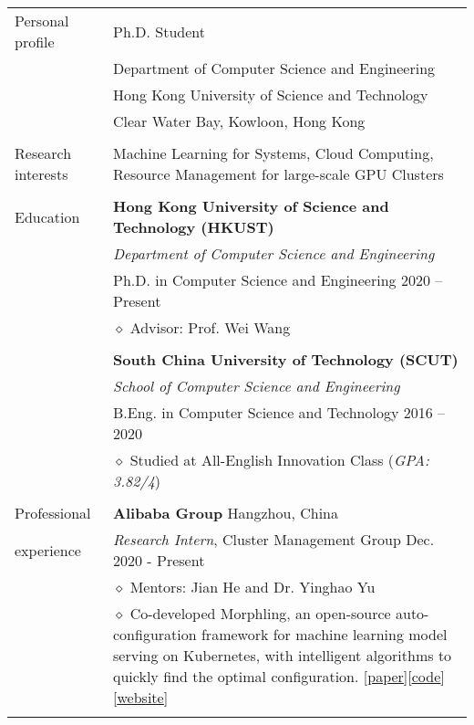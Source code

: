 \documentclass[letterpaper, 11pt]{article}
\begin{document}
\begin{longtable}{p{1in}p{5in}}

{Personal profile}
& Ph.D. Student \\
& Department of Computer Science and Engineering \\
& Hong Kong University of Science and Technology \\
& Clear Water Bay, Kowloon, Hong Kong \\
& \\

\nohyphens{Research interests}
& Machine Learning for Systems, Cloud Computing, Resource Management for large-scale GPU Clusters \\
& \\

{Education}
& \textbf{Hong Kong University of Science and Technology (HKUST)} \\
& \textit{Department of Computer Science and Engineering} \\
& Ph.D. in Computer Science and Engineering \hfill 2020 -- Present \\
& $\diamond$ Advisor: Prof. Wei Wang \\
& \\

& \textbf{South China University of Technology (SCUT)} \\
& \textit{School of Computer Science and Engineering} \\
& B.Eng. in Computer Science and Technology \hfill 2016 -- 2020 \\
& $\diamond$ Studied at All-English Innovation Class ({\it GPA: 3.82/4}) \\
& \\


{Professional}
& {\textbf{Alibaba Group}} \hfill Hangzhou, China \\
{experience}
& \textit{Research Intern}, Cluster Management Group \hfill Dec. 2020 - Present \\
& $\diamond$ Mentors: Jian He and Dr. Yinghao Yu \\
& $\diamond$ Co-developed Morphling, an open-source auto-configuration framework for machine learning model serving on Kubernetes, with intelligent algorithms to quickly find the optimal configuration. [\href{https://www.cse.ust.hk/~weiwa/papers/morphling-socc21.pdf}{\underline{paper}}][\href{https://github.com/kubedl-io/morphling}{\underline{code}}][\href{https://kubedl.io/tuning/intro/}{\underline{website}}] \\
& \\


\end{longtable}
\end{document}
